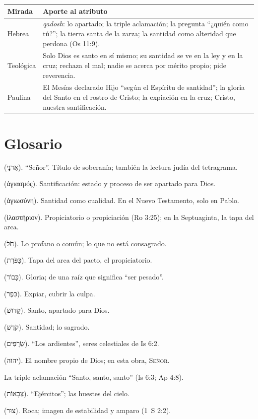 \documentclass[11pt,letterpaper]{article}
\newcommand{\heb}[1]{\mbox{\foreignlanguage{hebrew}{#1}}}
\newcommand{\grc}[1]{\foreignlanguage{ancientgreek}{#1}}
\newcommand{\SENOR}{\textsc{Señor}}
\begin{document}
\begin{center}\small\renewcommand{\arraystretch}{1.3}
\begin{tabular}{@{}L{3.0cm}L{11.4cm}@{}}
\toprule
\textbf{Mirada} & \textbf{Aporte al atributo} \\ \midrule
Hebrea & \emph{qadosh}: lo apartado; la triple aclamación; la pregunta ``¿quién como tú?''; la tierra santa de la zarza; la santidad como alteridad que perdona (Os 11:9). \\
Teológica & Solo Dios es santo en sí mismo; su santidad se ve en la ley y en la cruz; rechaza el mal; nadie se acerca por mérito propio; pide reverencia. \\
Paulina & El Mesías declarado Hijo ``según el Espíritu de santidad''; la gloria del Santo en el rostro de Cristo; la expiación en la cruz; Cristo, nuestra santificación. \\
\bottomrule
\end{tabular}\end{center}

\section*{Glosario}
\begin{description}\setlength{\itemsep}{2pt}
\item[\emph{Adonay}] (\heb{אֲדֹנָי}). ``Señor''. Título de soberanía; también la lectura judía del tetragrama.
\item[\emph{Hagiasmós}] (\grc{ἁγιασμός}). Santificación: estado y proceso de ser apartado para Dios.
\item[\emph{Hagiōsýnē}] (\grc{ἁγιωσύνη}). Santidad como cualidad. En el Nuevo Testamento, solo en Pablo.
\item[\emph{Hilastērion}] (\grc{ἱλαστήριον}). Propiciatorio o propiciación (Ro 3:25); en la Septuaginta, la tapa del arca.
\item[\emph{Jol}] (\heb{חֹל}). Lo profano o común; lo que no está consagrado.
\item[\emph{Kapporet}] (\heb{כַּפֹּרֶת}). Tapa del arca del pacto, el propiciatorio.
\item[\emph{Kavod}] (\heb{כָּבוֹד}). Gloria; de una raíz que significa ``ser pesado''.
\item[\emph{Kipper}] (\heb{כִּפֶּר}). Expiar, cubrir la culpa.
\item[\emph{Qadosh}] (\heb{קָדוֹשׁ}). Santo, apartado para Dios.
\item[\emph{Qódesh}] (\heb{קֹדֶשׁ}). Santidad; lo sagrado.
\item[\emph{Serafim}] (\heb{שְׂרָפִים}). ``Los ardientes'', seres celestiales de Is 6:2.
\item[Tetragrama] (\heb{יהוה}). El nombre propio de Dios; en esta obra, \SENOR.
\item[Trisagio] La triple aclamación ``Santo, santo, santo'' (Is 6:3; Ap 4:8).
\item[\emph{Tseva'ot}] (\heb{צְבָאוֹת}). ``Ejércitos''; las huestes del cielo.
\item[\emph{Tsur}] (\heb{צוּר}). Roca; imagen de estabilidad y amparo (1~S 2:2).
\end{description}
\end{document}
